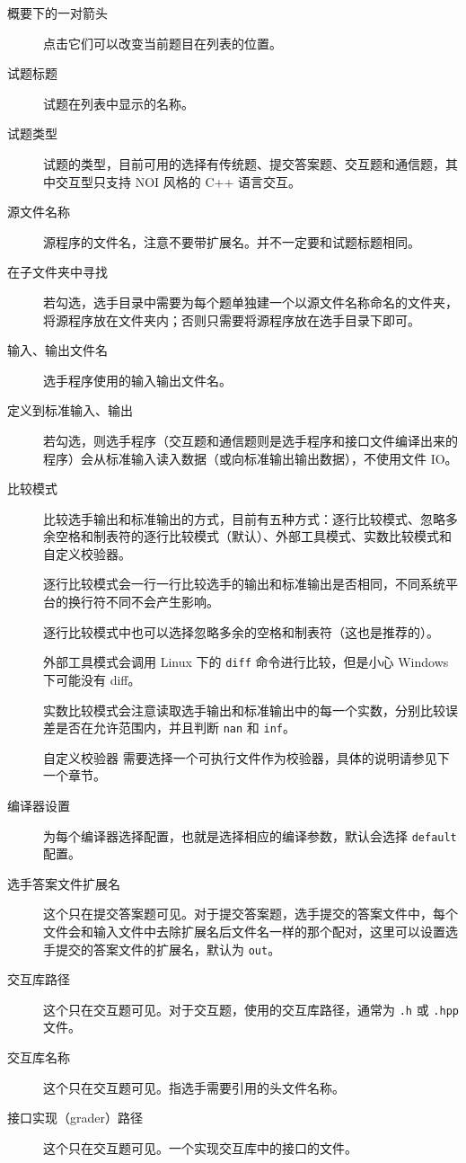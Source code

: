 \documentclass[UTF-8]{ctexart}
\begin{document}
			\begin{description}
				\item[概要下的一对箭头] 点击它们可以改变当前题目在列表的位置。
				\item[试题标题] 试题在列表中显示的名称。
				\item[试题类型] 试题的类型，目前可用的选择有传统题、提交答案题、交互题和通信题，其中交互型只支持 NOI 风格的 C++ 语言交互。
				\item[源文件名称] 源程序的文件名，注意不要带扩展名。并不一定要和试题标题相同。
				\item[在子文件夹中寻找] 若勾选，选手目录中需要为每个题单独建一个以源文件名称命名的文件夹，将源程序放在文件夹内；否则只需要将源程序放在选手目录下即可。
				\item[输入、输出文件名] 选手程序使用的输入输出文件名。
				\item[定义到标准输入、输出] 若勾选，则选手程序（交互题和通信题则是选手程序和接口文件编译出来的程序）会从标准输入读入数据（或向标准输出输出数据），不使用文件 IO。
				\item[比较模式] 比较选手输出和标准输出的方式，目前有五种方式：逐行比较模式、忽略多余空格和制表符的逐行比较模式（默认）、外部工具模式、实数比较模式和自定义校验器。
				
				逐行比较模式会一行一行比较选手的输出和标准输出是否相同，不同系统平台的换行符不同不会产生影响。
				
				逐行比较模式中也可以选择忽略多余的空格和制表符（这也是推荐的）。
				
				外部工具模式会调用 Linux 下的 \texttt{diff} 命令进行比较，但是小心 Windows 下可能没有 diff。
				
				实数比较模式会注意读取选手输出和标准输出中的每一个实数，分别比较误差是否在允许范围内，并且判断 \texttt{nan} 和 \texttt{inf}。
				
				自定义校验器 需要选择一个可执行文件作为校验器，具体的说明请参见下一个章节。
				\item[编译器设置] 为每个编译器选择配置，也就是选择相应的编译参数，默认会选择 \texttt{default} 配置。
				
				\item[选手答案文件扩展名] 这个只在提交答案题可见。对于提交答案题，选手提交的答案文件中，每个文件会和输入文件中去除扩展名后文件名一样的那个配对，这里可以设置选手提交的答案文件的扩展名，默认为 \texttt{out}。
				
				\item[交互库路径] 这个只在交互题可见。对于交互题，使用的交互库路径，通常为 \texttt{.h} 或 \texttt{.hpp} 文件。
				\item[交互库名称] 这个只在交互题可见。指选手需要引用的头文件名称。
				\item[接口实现（grader）路径] 这个只在交互题可见。一个实现交互库中的接口的文件。
				

\end{description}
\end{document}
